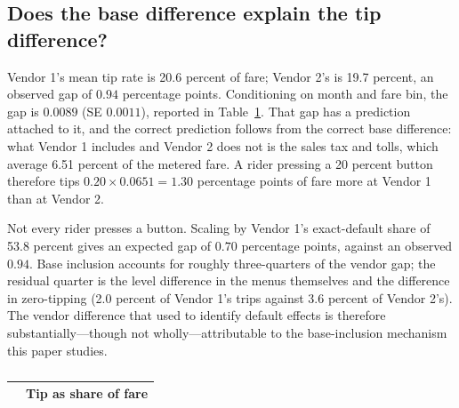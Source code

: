 \subsection{Does the base difference explain the tip difference?}
Vendor 1's mean tip rate is 20.6 percent of fare; Vendor 2's is 19.7
percent, an observed gap of $0.94$ percentage points. Conditioning on
month and fare bin, the gap is $0.0089$ (SE $0.0011$), reported in
Table~\ref{tab:hp}. That gap has a prediction attached to it, and the
correct prediction follows from the correct base difference: what Vendor
1 includes and Vendor 2 does not is the sales tax and tolls, which
average 6.51 percent of the metered fare. A rider pressing a 20 percent
button therefore tips $0.20 \times 0.0651 = 1.30$ percentage points of
fare more at Vendor 1 than at Vendor 2.

Not every rider presses a button. Scaling by Vendor 1's exact-default
share of 53.8 percent gives an expected gap of $0.70$ percentage
points, against an observed $0.94$. Base inclusion accounts for roughly
three-quarters of the vendor gap; the residual quarter is the level
difference in the menus themselves and the difference in zero-tipping
(2.0 percent of Vendor 1's trips against 3.6 percent of Vendor 2's).
The vendor difference that \textcite{haggag2014default} used to identify
default effects is therefore substantially---though not
wholly---attributable to the base-inclusion mechanism this paper
studies.

\begin{table}[!htbp]
  \centering
  \singlespacing
  \caption{}
  \label{tab:hp}
  \small
  \begin{tabular}{@{}lc@{}}
    \toprule
    & Tip as share of fare \\
    \midrule
    
    \bottomrule
  \end{tabular}
\end{table}

